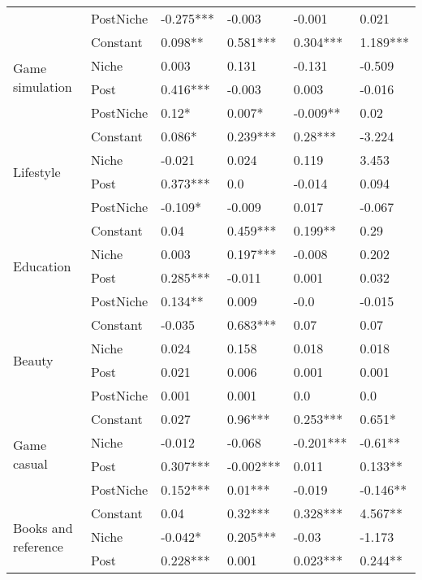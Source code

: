 \begin{table}[h!]
\begin{tabular}{llllll}
          & PostNiche &  -0.275*** &  -0.003 &  -0.001 &  0.021 \\
\cline{1-6}
\multirow{4}{*}{Game simulation} & Constant &  0.098** &  0.581*** &  0.304*** &  1.189*** \\
          & Niche &  0.003 &  0.131 &  -0.131 &  -0.509 \\
          & Post &  0.416*** &  -0.003 &  0.003 &  -0.016 \\
          & PostNiche &  0.12* &  0.007* &  -0.009** &  0.02 \\
\cline{1-6}
\multirow{4}{*}{Lifestyle} & Constant &  0.086* &  0.239*** &  0.28*** &  -3.224 \\
          & Niche &  -0.021 &  0.024 &  0.119 &  3.453 \\
          & Post &  0.373*** &  0.0 &  -0.014 &  0.094 \\
          & PostNiche &  -0.109* &  -0.009 &  0.017 &  -0.067 \\
\cline{1-6}
\multirow{4}{*}{Education} & Constant &  0.04 &  0.459*** &  0.199** &  0.29 \\
          & Niche &  0.003 &  0.197*** &  -0.008 &  0.202 \\
          & Post &  0.285*** &  -0.011 &  0.001 &  0.032 \\
          & PostNiche &  0.134** &  0.009 &  -0.0 &  -0.015 \\
\cline{1-6}
\multirow{4}{*}{Beauty} & Constant &  -0.035 &  0.683*** &  0.07 &  0.07 \\
          & Niche &  0.024 &  0.158 &  0.018 &  0.018 \\
          & Post &  0.021 &  0.006 &  0.001 &  0.001 \\
          & PostNiche &  0.001 &  0.001 &  0.0 &  0.0 \\
\cline{1-6}
\multirow{4}{*}{Game casual} & Constant &  0.027 &  0.96*** &  0.253*** &  0.651* \\
          & Niche &  -0.012 &  -0.068 &  -0.201*** &  -0.61** \\
          & Post &  0.307*** &  -0.002*** &  0.011 &  0.133** \\
          & PostNiche &  0.152*** &  0.01*** &  -0.019 &  -0.146** \\
\cline{1-6}
\multirow{4}{*}{Books and reference} & Constant &  0.04 &  0.32*** &  0.328*** &  4.567** \\
          & Niche &  -0.042* &  0.205*** &  -0.03 &  -1.173 \\
          & Post &  0.228*** &  0.001 &  0.023*** &  0.244** \\

\end{tabular}
\end{table}
